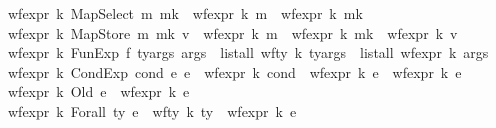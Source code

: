 \begin{isabellebody}
\ \ {\isacharbar}{\kern0pt}\ {\isachardoublequoteopen}wf{\isacharunderscore}{\kern0pt}expr\ k\ {\isacharparenleft}{\kern0pt}MapSelect\ m\ mk{\isacharparenright}{\kern0pt}\ {\isacharequal}{\kern0pt}\ {\isacharparenleft}{\kern0pt}wf{\isacharunderscore}{\kern0pt}expr\ k\ m\ {\isasymand}\ wf{\isacharunderscore}{\kern0pt}expr\ k\ mk{\isacharparenright}{\kern0pt}{\isachardoublequoteclose}\isanewline
\ \ {\isacharbar}{\kern0pt}\ {\isachardoublequoteopen}wf{\isacharunderscore}{\kern0pt}expr\ k\ {\isacharparenleft}{\kern0pt}MapStore\ m\ mk\ v{\isacharparenright}{\kern0pt}\ {\isacharequal}{\kern0pt}\ {\isacharparenleft}{\kern0pt}wf{\isacharunderscore}{\kern0pt}expr\ k\ m\ {\isasymand}\ wf{\isacharunderscore}{\kern0pt}expr\ k\ mk\ {\isasymand}\ wf{\isacharunderscore}{\kern0pt}expr\ k\ v{\isacharparenright}{\kern0pt}{\isachardoublequoteclose}\isanewline
\ \ {\isacharbar}{\kern0pt}\ {\isachardoublequoteopen}wf{\isacharunderscore}{\kern0pt}expr\ k\ {\isacharparenleft}{\kern0pt}FunExp\ f\ ty{\isacharunderscore}{\kern0pt}args\ args{\isacharparenright}{\kern0pt}\ {\isacharequal}{\kern0pt}\ {\isacharparenleft}{\kern0pt}{\isacharparenleft}{\kern0pt}list{\isacharunderscore}{\kern0pt}all\ {\isacharparenleft}{\kern0pt}wf{\isacharunderscore}{\kern0pt}ty\ k{\isacharparenright}{\kern0pt}\ ty{\isacharunderscore}{\kern0pt}args{\isacharparenright}{\kern0pt}\ {\isasymand}\ {\isacharparenleft}{\kern0pt}list{\isacharunderscore}{\kern0pt}all\ {\isacharparenleft}{\kern0pt}wf{\isacharunderscore}{\kern0pt}expr\ k{\isacharparenright}{\kern0pt}\ args{\isacharparenright}{\kern0pt}{\isacharparenright}{\kern0pt}{\isachardoublequoteclose}\isanewline
\ \ {\isacharbar}{\kern0pt}\ {\isachardoublequoteopen}wf{\isacharunderscore}{\kern0pt}expr\ k\ {\isacharparenleft}{\kern0pt}CondExp\ cond\ e{}\ e{}{\isacharparenright}{\kern0pt}\ {\isacharequal}{\kern0pt}\ {\isacharparenleft}{\kern0pt}wf{\isacharunderscore}{\kern0pt}expr\ k\ cond\ {\isasymand}\ wf{\isacharunderscore}{\kern0pt}expr\ k\ e{}\ {\isasymand}\ wf{\isacharunderscore}{\kern0pt}expr\ k\ e{}{\isacharparenright}{\kern0pt}{\isachardoublequoteclose}\isanewline
\ \ {\isacharbar}{\kern0pt}\ {\isachardoublequoteopen}wf{\isacharunderscore}{\kern0pt}expr\ k\ {\isacharparenleft}{\kern0pt}Old\ e{\isacharparenright}{\kern0pt}\ {\isacharequal}{\kern0pt}\ wf{\isacharunderscore}{\kern0pt}expr\ k\ e{\isachardoublequoteclose}\isanewline
\ \ {\isacharbar}{\kern0pt}\ {\isachardoublequoteopen}wf{\isacharunderscore}{\kern0pt}expr\ k\ {\isacharparenleft}{\kern0pt}Forall\ ty\ e{\isacharparenright}{\kern0pt}\ {\isacharequal}{\kern0pt}\ {\isacharparenleft}{\kern0pt}{\isacharparenleft}{\kern0pt}wf{\isacharunderscore}{\kern0pt}ty\ k\ ty{\isacharparenright}{\kern0pt}\ {\isasymand}\ {\isacharparenleft}{\kern0pt}wf{\isacharunderscore}{\kern0pt}expr\ k\ e{\isacharparenright}{\kern0pt}{\isacharparenright}{\kern0pt}{\isachardoublequoteclose}\isanewline

\end{isabellebody}

